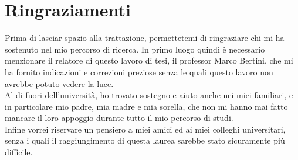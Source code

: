 \chapter{Ringraziamenti}\label{ch:ringraziamenti}
Prima di lasciar spazio alla trattazione, permettetemi di ringraziare chi mi ha sostenuto nel mio percorso di ricerca. In primo luogo quindi è necessario menzionare il relatore di questo lavoro di tesi, il professor Marco Bertini, che mi ha fornito indicazioni e correzioni preziose senza le quali questo lavoro non avrebbe potuto vedere la luce.
\\Al di fuori dell'università, ho trovato sostegno e aiuto anche nei miei familiari, e in particolare mio padre, mia madre e mia sorella, che non mi hanno mai fatto mancare il loro appoggio durante tutto il mio percorso di studi.
\\Infine vorrei riservare un pensiero a miei amici ed ai miei colleghi universitari, senza i quali il raggiungimento di questa laurea sarebbe stato sicuramente più difficile.